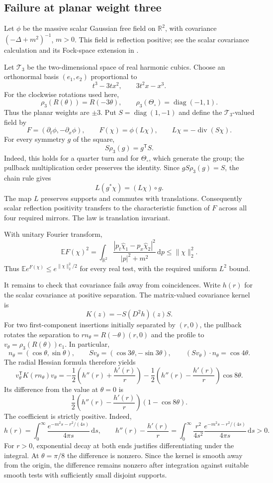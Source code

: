 \documentclass[11pt, letterpaper, reqno]{amsart}
\theoremstyle{definition}
\theoremstyle{remark}
\newcommand{\bbE}{\mathbb{E}}
\newcommand{\bbR}{\mathbb{R}}
\newcommand{\calT}{\mathcal{T}}
\newcommand{\dd}{\,\mathrm{d}}
\begin{document}
\subsection{Failure at planar weight three}

Let $\phi$ be the massive scalar Gaussian free field on $\bbR^2$,
with covariance $(-\Delta+m^2)^{-1}$, $m>0$. This field is reflection
positive; see the scalar covariance calculation and its Fock-space
extension in \cite[pp.~119--120]{Uhl79}.

Let $\calT_3$ be the two-dimensional space of real harmonic cubics.
Choose an orthonormal basis $(e_1,e_2)$ proportional to
\[
 t^3-3tx^2,\qquad 3t^2x-x^3.
\]
For the clockwise rotations used here,
\[
 \rho_3(R(\theta))=R(-3\theta),\qquad
 \rho_3(\Theta_\circ)=\operatorname{diag}(-1,1).
\]
Thus the planar weights are $\pm3$. Put $S=\operatorname{diag}(1,-1)$
and define the $\calT_3$-valued field by
\[
 F=(\partial_t\phi,-\partial_x\phi),\qquad
 F(\chi)=\phi(L\chi),\qquad L\chi=-\operatorname{div}(S\chi).
\]
For every symmetry $g$ of the square,
\[
 S\rho_3(g)=g^{\mathsf T}S.
\]
Indeed, this holds for a quarter turn and for $\Theta_\circ$, which
generate the group; the pullback multiplication order preserves the
identity. Since $gS\rho_3(g)=S$, the chain rule gives
\[
 L(g^*\chi)=(L\chi)\circ g.
\]
The map $L$ preserves supports and commutes with translations.
Consequently scalar reflection positivity transfers to the
characteristic function of $F$ across all four required mirrors.
The law is translation invariant.

With unitary Fourier transform,
\[
 \bbE F(\chi)^2
 =\int_{\bbR^2}
 \frac{|p_t\widehat\chi_1-p_x\widehat\chi_2|^2}
 {|p|^2+m^2}\dd p
 \leq\|\chi\|_2^2.
\]
Thus $\bbE e^{F(\chi)}\leq e^{\|\chi\|_2^2/2}$ for every real
test, with the required uniform $L^2$ bound.

It remains to check that covariance fails away from coincidences.
Write $h(r)$ for the scalar covariance at positive separation. The
matrix-valued covariance kernel is
\[
 K(z)=-S(D^2h)(z)S.
\]
For two first-component insertions initially separated by $(r,0)$,
the pullback rotates the separation to $r n_\theta=R(-\theta)(r,0)$
and the profile to $v_\theta=\rho_3(R(\theta))e_1$. In particular,
\[
 n_\theta=(\cos\theta,\sin\theta),\qquad
 S v_\theta=(\cos3\theta,-\sin3\theta),\qquad
 (S v_\theta)\cdot n_\theta=\cos4\theta.
\]
The radial Hessian formula therefore yields
\[
 v_\theta^{\mathsf T}K(rn_\theta)v_\theta
 =-\frac12\left(h''(r)+\frac{h'(r)}r\right)
  -\frac12\left(h''(r)-\frac{h'(r)}r\right)\cos8\theta.
\]
Its difference from the value at $\theta=0$ is
\[
 \frac12\left(h''(r)-\frac{h'(r)}r\right)(1-\cos8\theta).
\]
The coefficient is strictly positive. Indeed,
\[
 h(r)=\int_0^\infty
       \frac{e^{-m^2s-r^2/(4s)}}{4\pi s}\dd s,
 \qquad
 h''(r)-\frac{h'(r)}r
 =\int_0^\infty\frac{r^2}{4s^2}
       \frac{e^{-m^2s-r^2/(4s)}}{4\pi s}\dd s>0.
\]
For $r>0$, exponential decay at both ends justifies differentiating
under the integral. At $\theta=\pi/8$ the difference is nonzero.
Since the kernel is smooth away from the origin, the difference
remains nonzero after integration against suitable smooth tests
with sufficiently small disjoint supports.
\end{document}
